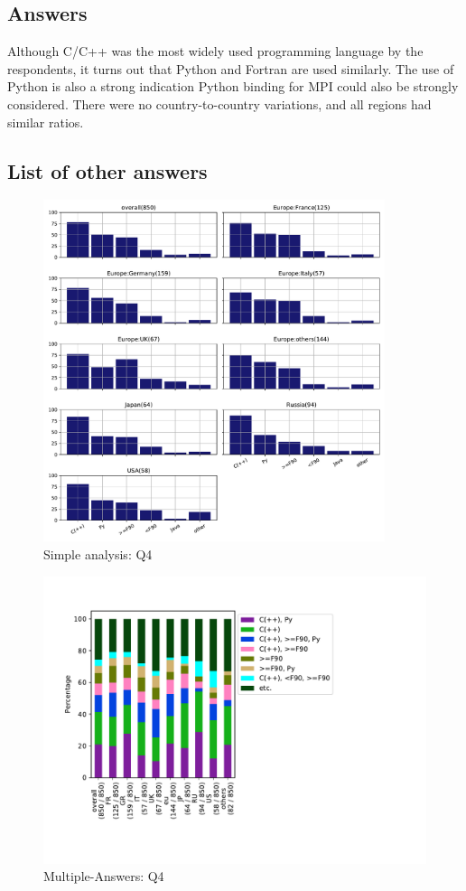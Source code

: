 
\subsection{Answers}



Although C/C++ was the most widely used programming language by the
respondents,  
it turns out that Python and Fortran are used similarly.  The use of
Python is 
also a strong indication Python binding for MPI could also be strongly
considered. There were no
country-to-country variations, and all regions had similar ratios.

\subsection{List of other answers}
\begin{itemize}

\end{itemize}

\begin{figure}[htb]
\begin{center}
\includegraphics[width=10cm]{../pdfs/Q4.pdf}
\caption{Simple analysis: Q4}
\label{fig:Q4}
\end{center}
\end{figure}

\begin{figure}[htb]
\begin{center}
\includegraphics[width=14cm]{../pdfs/Q4-mans.pdf}
\caption{Multiple-Answers: Q4}
\label{fig:Q4-mans}
\end{center}
\end{figure}
